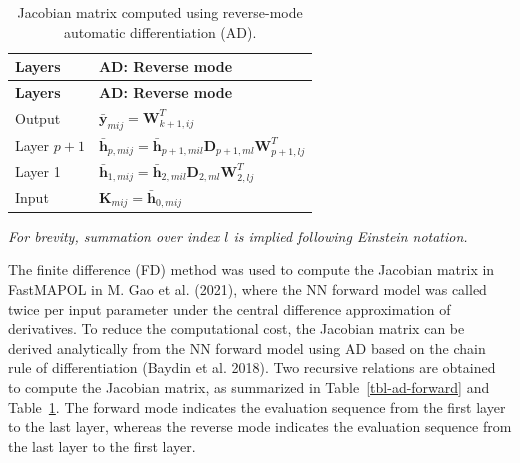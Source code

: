 \documentclass[
  11pt,
  letterpaper,
  DIV=11,
  numbers=noendperiod]{scrreprt}
\begin{document}
\begin{longtable}[]{@{}
  >{\raggedright\arraybackslash}p{}
  >{\raggedright\arraybackslash}p{}@{}}
\caption{Jacobian matrix computed using reverse-mode automatic
differentiation (AD).}\label{tbl-ad-reverse}\tabularnewline
\toprule\noalign{}
\begin{minipage}[b]{\linewidth}\raggedright
\textbf{Layers}
\end{minipage} & \begin{minipage}[b]{\linewidth}\raggedright
\textbf{AD: Reverse mode}
\end{minipage} \\
\midrule\noalign{}
\endfirsthead
\toprule\noalign{}
\begin{minipage}[b]{\linewidth}\raggedright
\textbf{Layers}
\end{minipage} & \begin{minipage}[b]{\linewidth}\raggedright
\textbf{AD: Reverse mode}
\end{minipage} \\
\midrule\noalign{}
\endhead
\bottomrule\noalign{}
\endlastfoot
Output & \(\bar{\mathbf{y}}_{mij}=\mathbf{W}_{k+1,ij}^T\) \\
Layer \(p+1\) &
\(\bar{\mathbf{h}}_{p,mij}=\bar{\mathbf{h}}_{p+1,mil}\mathbf{D}_{p+1,ml}\mathbf{W}_{p+1,lj}^T\) \\
Layer 1 &
\(\bar{\mathbf{h}}_{1,mij}=\bar{\mathbf{h}}_{2,mil}\mathbf{D}_{2,ml}\mathbf{W}_{2,lj}^T\) \\
Input & \(\mathbf{K}_{mij}=\bar{\mathbf{h}}_{0,mij}\) \\
\end{longtable}

\emph{For brevity, summation over index \(l\) is implied following
Einstein notation.}

The finite difference (FD) method was used to compute the Jacobian
matrix in FastMAPOL in M. Gao et al. (2021), where the NN forward model
was called twice per input parameter under the central difference
approximation of derivatives. To reduce the computational cost, the
Jacobian matrix can be derived analytically from the NN forward model
using AD based on the chain rule of differentiation (Baydin et al.
2018). Two recursive relations are obtained to compute the Jacobian
matrix, as summarized in Table~\ref{tbl-ad-forward} and
Table~\ref{tbl-ad-reverse}. The forward mode indicates the evaluation
sequence from the first layer to the last layer, whereas the reverse
mode indicates the evaluation sequence from the last layer to the first
layer.
\end{document}
